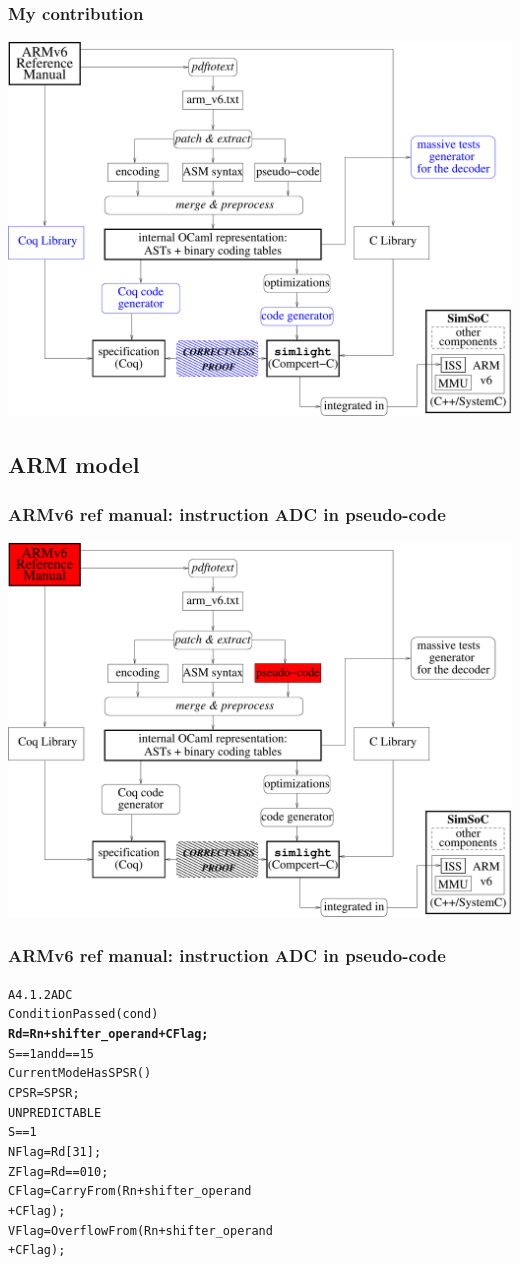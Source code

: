 \documentclass[usenames,dvipsnames]{beamer} %
\begin{document}
\begin{frame}
\frametitle{My contribution}
\hfil\includegraphics[width=.9\linewidth]{fig/mypart.pdf}
\end{frame}
\subsection{ARM model}

\begin{frame}
\frametitle{ARMv6 ref manual: instruction ADC in pseudo-code}
\hfil\includegraphics[width=.9\linewidth]{fig/highlight_ref.pdf}
\end{frame}

\begin{frame}[fragile]
\frametitle{ARMv6 ref manual: instruction ADC in pseudo-code}
\begin{alltt}
A4.1.2 ADC
   ConditionPassed(cond) 
    \textbf{Rd = Rn + shifter_operand + C Flag;}
     S == 1 and d == 15 
       CurrentModeHasSPSR() 
          CPSR = SPSR;
       UNPREDICTABLE
      S == 1 
      N Flag = Rd[31];
      Z Flag =  Rd == 0  1  0;
      C Flag = CarryFrom(Rn + shifter_operand
                            + C Flag);
      V Flag = OverflowFrom(Rn + shifter_operand
                               + C Flag);

\end{alltt}
\end{frame}
\end{document}
